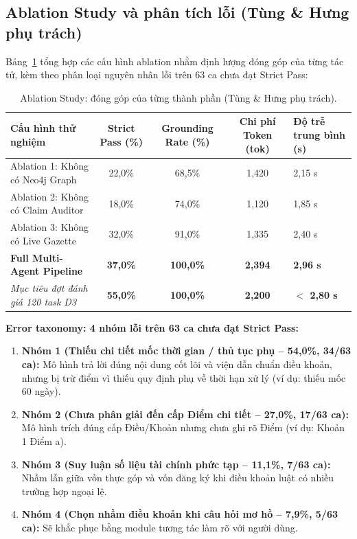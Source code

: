 \documentclass[10pt,a4paper]{article}
\begin{document}
\subsection{Ablation Study và phân tích lỗi (Tùng \& Hưng phụ trách)}
Bảng~\ref{tab:ablation-metrics} tổng hợp các cấu hình ablation nhằm định lượng đóng góp của từng tác tử, kèm theo phân loại nguyên nhân lỗi trên 63 ca chưa đạt Strict Pass:

\begin{table}[htbp]
\centering
\small
\caption{Ablation Study: đóng góp của từng thành phần (Tùng \& Hưng phụ trách).}
\label{tab:ablation-metrics}
\begin{tabularx}{\linewidth}{@{}p{4.8cm} c c c X@{}}
\toprule
\textbf{Cấu hình thử nghiệm} & \textbf{Strict Pass (\%)} & \textbf{Grounding Rate (\%)} & \textbf{Chi phí Token (tok)} & \textbf{Độ trễ trung bình (s)} \\
\midrule
Ablation 1: Không có Neo4j Graph & 22{,}0\% & 68{,}5\% & 1{,}420 & 2{,}15 s \\
Ablation 2: Không có Claim Auditor & 18{,}0\% & 74{,}0\% & 1{,}120 & 1{,}85 s \\
Ablation 3: Không có Live Gazette & 32{,}0\% & 91{,}0\% & 1{,}335 & 2{,}40 s \\
\textbf{Full Multi-Agent Pipeline} & \textbf{37{,}0\%} & \textbf{100{,}0\%} & \textbf{2{,}394} & \textbf{2{,}96 s} \\
\midrule
\textit{Mục tiêu đợt đánh giá 120 task D3} & \textbf{55{,}0\%} & \textbf{100{,}0\%} & \textbf{2{,}200} & \textbf{$<$ 2{,}80 s} \\
\bottomrule
\end{tabularx}
\end{table}

\textbf{Error taxonomy: 4 nhóm lỗi trên 63 ca chưa đạt Strict Pass:}
\begin{enumerate}
  \item \textbf{Nhóm 1 (Thiếu chi tiết mốc thời gian / thủ tục phụ -- 54{,}0\%, 34/63 ca):} Mô hình trả lời đúng nội dung cốt lõi và viện dẫn chuẩn điều khoản, nhưng bị trừ điểm vì thiếu quy định phụ về thời hạn xử lý (ví dụ: thiếu mốc 60 ngày).
  \item \textbf{Nhóm 2 (Chưa phân giải đến cấp Điểm chi tiết -- 27{,}0\%, 17/63 ca):} Mô hình trích đúng cấp Điều/Khoản nhưng chưa ghi rõ Điểm (ví dụ: Khoản 1 Điểm a).
  \item \textbf{Nhóm 3 (Suy luận số liệu tài chính phức tạp -- 11{,}1\%, 7/63 ca):} Nhầm lẫn giữa vốn thực góp và vốn đăng ký khi điều khoản luật có nhiều trường hợp ngoại lệ.
  \item \textbf{Nhóm 4 (Chọn nhầm điều khoản khi câu hỏi mơ hồ -- 7{,}9\%, 5/63 ca):} Sẽ khắc phục bằng module tương tác làm rõ với người dùng.
\end{enumerate}
\end{document}
